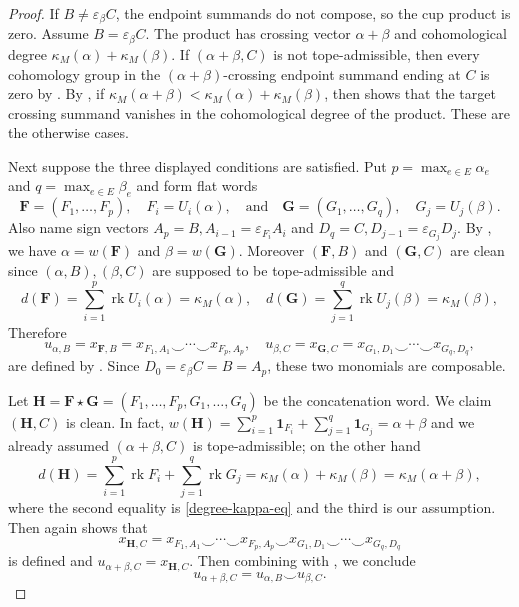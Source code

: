 \documentclass[10pt]{amsart}
\theoremstyle{plain}
\theoremstyle{definition}
\newcommand{\one}{\mathbf{1}}
\newcommand{\rk}{\operatorname{rk}}
\newcommand{\eps}{\varepsilon}
\newcommand{\bF}{\boldsymbol{F}}
\newcommand{\bH}{\boldsymbol{H}}
\newcommand{\bG}{\boldsymbol{G}}
\begin{document}
\begin{proof}
If $B\neq\eps_\beta C$, the endpoint summands do not compose, so the cup product is zero. Assume $B=\eps_\beta C$. The product has crossing vector $\alpha+\beta$ and cohomological degree $\kappa_M(\alpha)+\kappa_M(\beta)$. If $(\alpha+\beta,C)$ is not tope-admissible, then every cohomology group in the $(\alpha+\beta)$-crossing endpoint summand ending at $C$ is zero by . By , if $\kappa_M(\alpha+\beta)<\kappa_M(\alpha)+\kappa_M(\beta)$, then  shows that the target crossing summand vanishes in the cohomological degree of the product. These are the otherwise cases.

Next suppose the three displayed conditions are satisfied. Put $p=\max_{e\in E}\alpha_e$ and $q=\max_{e\in E}\beta_e$ and form flat words
\[
\bF=(F_1,\ldots,F_p),\quad F_i=U_i(\alpha), \quad \text{and} \quad \bG=(G_1,\ldots,G_q),\quad G_j=U_j(\beta).
\]
Also name sign vectors $A_p=B, A_{i-1}=\eps_{F_i}A_i$ and $D_q=C, D_{j-1}=\eps_{G_j}D_j$. By , we have $\alpha=w(\bF)$ and $\beta=w(\bG)$. Moreover $(\bF,B)$ and $(\bG,C)$ are clean since $(\alpha,B),(\beta,C)$ are supposed to be tope-admissible and 
\begin{equation}\label{degree-kappa-eq}
d(\bF)=\sum_{i=1}^p\rk U_i(\alpha)=\kappa_M(\alpha),\quad d(\bG)=\sum_{j=1}^q\rk U_j(\beta)=\kappa_M(\beta),  
\end{equation}
Therefore
\begin{equation}\label{two-factors}
u_{\alpha,B}=x_{\bF,B}=x_{F_1,A_1}\smile\cdots\smile x_{F_p,A_p}, \quad u_{\beta,C}=x_{\bG,C}=x_{G_1,D_1}\smile\cdots\smile x_{G_q,D_q},
\end{equation}
are defined by . Since $D_0=\eps_\beta C=B=A_p$, these two monomials are composable.

Let $\bH=\bF\star\bG=(F_1,\ldots,F_p,G_1,\ldots,G_q)$ be the concatenation word. We claim $(\bH,C)$ is clean. In fact, $w(\bH)=\sum_{i=1}^p\one_{F_i}+\sum_{j=1}^q\one_{G_j}=\alpha+\beta$ and we already assumed $(\alpha+\beta,C)$ is tope-admissible; on the other hand
\[
d(\bH)=\sum_{i=1}^p\rk F_i+\sum_{j=1}^q\rk G_j=\kappa_M(\alpha)+\kappa_M(\beta)=\kappa_M(\alpha+\beta),
\]
where the second equality is \eqref{degree-kappa-eq} and the third is our assumption. Then  again shows that
\[
x_{\bH,C}=x_{F_1,A_1}\smile\cdots\smile x_{F_p,A_p}\smile x_{G_1,D_1}\smile\cdots\smile x_{G_q,D_q}
\]
is defined and $u_{\alpha+\beta,C}=x_{\bH,C}$. Then combining with , we conclude
\[
u_{\alpha+\beta,C}=u_{\alpha,B}\smile u_{\beta,C}.
\]
\end{proof}
\end{document}
